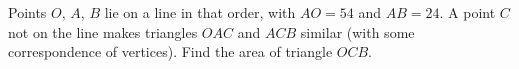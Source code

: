 Points $O$, $A$, $B$ lie on a line in that order, with $AO=54$ and $AB=24$. A point $C$ not on the line makes triangles $OAC$ and $ACB$ similar (with some correspondence of vertices). Find the area of triangle $OCB$.
